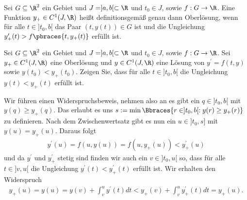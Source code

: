 \begin{definition}
    Sei $G \subseteq \R^2$ ein Gebiet und $J = ]a, b[ \subset \R$ und $t_0 \in J$, sowie $f: G \to \R$. Eine Funktion $y_+ \in C^1(J, \R)$ heißt definitionsgemäß genau dann Oberlösung, wenn für alle $t \in ]t_0, b[$ das Paar $(t, y(t)) \in G$ ist und die Ungleichung $y_+^\prime(t) > f\pbraces{t, y_+(t)}$ erfüllt ist.
\end{definition}

\begin{exercise}
    Sei $G \subseteq \R^2$ ein Gebiet und $J = ]a, b[ \subset \R$ und $t_0 \in J$, sowie $f: G \to \R$. Sei $y_+ \in C^1(J, \R)$ eine Oberlösung und $y \in C^1(J, \R)$ eine Lösung von $y^\prime = f(t,y)$ sowie $y(t_0) < y_+(t_0)$. Zeigen Sie, dass für alle $t \in ]t_0, b[$ die Ungleichung $y(t) < y_+(t)$ erfüllt ist.
\end{exercise}

\begin{solution}
    Wir führen einen Widerspruchsbeweis, nehmen also an es gibt ein $q \in ]t_0, b[$ mit $y(q) \geq y_+(q)$. Das erlaubt es uns $s := \min\Bbraces{r \in ]t_0, b[ : y(r) \geq y_+(r)}$ zu definieren. Nach dem Zwischenwertsatz gibt es nun ein $u \in ]t_0, s]$ mit $y(u) = y_+(u)$. Daraus folgt
    \begin{align*}
        y^\prime(u) = f(u, y(u)) = f(u, y_+(u)) < y_+^\prime(u)
    \end{align*}
    und da $y^\prime$ und $y_+^\prime$ stetig sind finden wir auch ein $v \in ]t_0, u[$ so, dass für alle $t \in ]v, u[$ die Ungleichung $y^\prime(t) < y_+^\prime(t)$ erfüllt ist. Wir erhalten den Widerspruch
    \begin{align*}
       y_+(u) = y(u) = y(v) + \int_v^u y^\prime(t) dt < y_+(v) + \int_v^u y_+^\prime(t) dt = y_+(u).
    \end{align*}
\end{solution}